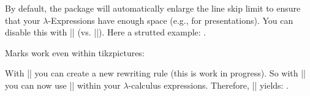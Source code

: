 \documentclass[parskip=half,english,numbers=noenddot,footnotes=nomultiple,oneside]{scrartcl}
\begin{document}
   By default, the package will automatically enlarge the line skip limit to ensure that your \(\lambda\)-Expressions have enough space (e.g., for presentations). You can disable this with |\lcDoNotStrutLine| (vs. |\lcDoStrutLine|). Here a strutted example: {\lcDoStrutLine{}}.


   Marks work even within tikzpictures:
   \begin{center}
   \end{center}

   With |\lcCreateNewRewritingRule| you can create a new rewriting rule (this is work in progress).
   So with |\lcCreateNewRewritingRule{}| you can now use |\cons| within your \(\lambda\)-calculus expressions. Therefore, \lcCreateNewRewritingRule{}|| yields: .
\end{document}
